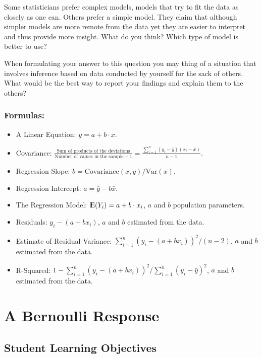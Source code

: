\documentclass[]{krantz}
\newcommand{\Expec}{{\rm I\kern-.3em E}}
\theoremstyle{definition}
\theoremstyle{definition}
\theoremstyle{definition}
\theoremstyle{remark}
\begin{document}
Some statisticians prefer complex models, models that try to fit the
data as closely as one can. Others prefer a simple model. They claim
that although simpler models are more remote from the data yet they are
easier to interpret and thus provide more insight. What do you think?
Which type of model is better to use?

When formulating your answer to this question you may thing of a
situation that involves inference based on data conducted by yourself
for the sack of others. What would be the best way to report your
findings and explain them to the others?

\hypertarget{formulas}{%
\subsection*{Formulas:}\label{formulas}}


\begin{itemize}
\item
  A Linear Equation: \(y = a + b \cdot x\).
\item
  Covariance:
  \(\frac{\mbox{Sum of products of the deviations}}{\mbox{Number of values in the sample}-1} = \frac{\sum_{i=1}^n (y_i-\bar y)(x_i - \bar x)}{n-1}\).
\item
  Regression Slope: \(b = \mbox{Covariance}(x,y)/\mbox{Var}(x)\).
\item
  Regression Intercept: \(a = \bar y - b\bar x\).
\item
  The Regression Model: \(\Expec(Y_i) = a + b \cdot x_i\), \(a\) and \(b\)
  population parameters.
\item
  Residuals: \(y_i - (a + bx_i)\), \(a\) and \(b\) estimated from the data.
\item
  Estimate of Residual Variance:
  \(\sum_{i=1}^n(y_i - (a + bx_i))^2/(n-2)\), \(a\) and \(b\) estimated from
  the data.
\item
  R-Squared:
  \(1 - \sum_{i=1}^n(y_i - (a + bx_i))^2/\sum_{i=1}^n(y_i - \bar y)^2\),
  \(a\) and \(b\) estimated from the data.
\end{itemize}

\hypertarget{ChapLogistic}{%
\chapter{A Bernoulli Response}\label{ChapLogistic}}

\hypertarget{student-learning-objectives-9}{%
\section{Student Learning Objectives}\label{student-learning-objectives-9}}
\end{document}
